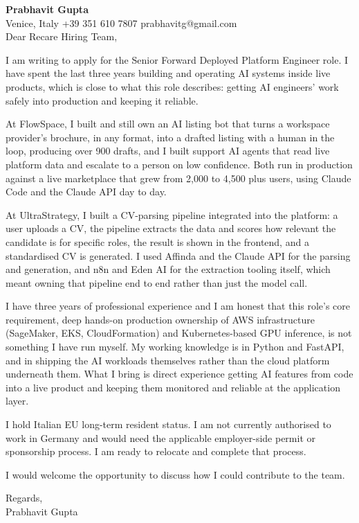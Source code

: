 \documentclass[a4paper,10.5pt]{article}
\begin{document}
\textbf{Prabhavit Gupta}\\
Venice, Italy \textbar{} +39 351 610 7807 \textbar{} prabhavitg@gmail.com\\[10pt]
Dear Recare Hiring Team,

I am writing to apply for the Senior Forward Deployed Platform Engineer role. I have spent the last three years building and operating AI systems inside live products, which is close to what this role describes: getting AI engineers' work safely into production and keeping it reliable.

At FlowSpace, I built and still own an AI listing bot that turns a workspace provider's brochure, in any format, into a drafted listing with a human in the loop, producing over 900 drafts, and I built support AI agents that read live platform data and escalate to a person on low confidence. Both run in production against a live marketplace that grew from 2,000 to 4,500 plus users, using Claude Code and the Claude API day to day.

At UltraStrategy, I built a CV-parsing pipeline integrated into the platform: a user uploads a CV, the pipeline extracts the data and scores how relevant the candidate is for specific roles, the result is shown in the frontend, and a standardised CV is generated. I used Affinda and the Claude API for the parsing and generation, and n8n and Eden AI for the extraction tooling itself, which meant owning that pipeline end to end rather than just the model call.

I have three years of professional experience and I am honest that this role's core requirement, deep hands-on production ownership of AWS infrastructure (SageMaker, EKS, CloudFormation) and Kubernetes-based GPU inference, is not something I have run myself. My working knowledge is in Python and FastAPI, and in shipping the AI workloads themselves rather than the cloud platform underneath them. What I bring is direct experience getting AI features from code into a live product and keeping them monitored and reliable at the application layer.

I hold Italian EU long-term resident status. I am not currently authorised to work in Germany and would need the applicable employer-side permit or sponsorship process. I am ready to relocate and complete that process.

I would welcome the opportunity to discuss how I could contribute to the team.

Regards,\\
Prabhavit Gupta
\end{document}
